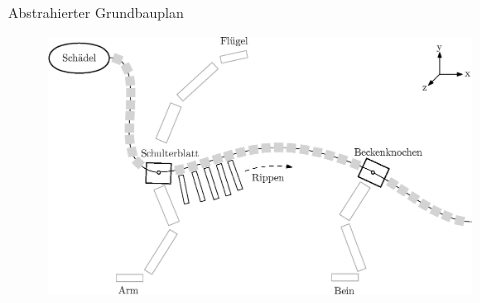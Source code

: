 \documentclass{beamer}
\begin{document}
\begin{frame}{Abstrahierter Grundbauplan}
 \begin{figure}
  \centering
  \includegraphics[width=\textwidth]{../graphics/skeletonPlan}
 \end{figure}
\end{frame}
\end{document}
